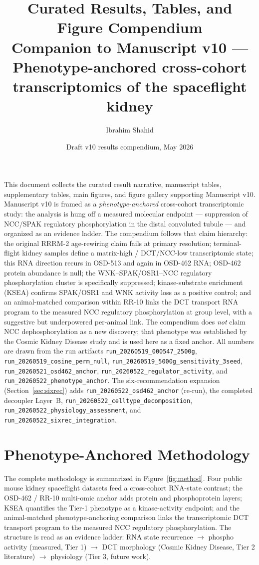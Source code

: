 \documentclass[10pt]{article}
\title{\textbf{Curated Results, Tables, and Figure Compendium}\\[0.3em]
\large Companion to Manuscript v10 --- Phenotype-anchored cross-cohort transcriptomics of the spaceflight kidney}
\author{Ibrahim Shahid}
\date{Draft v10 results compendium, May 2026}
\newcommand{\code}[1]{\texttt{#1}}
\begin{document}
\maketitle
\thispagestyle{fancy}

\noindent
This document collects the curated result narrative, manuscript tables, supplementary tables, main figures, and figure gallery supporting Manuscript v10. Manuscript v10 is framed as a \emph{phenotype-anchored} cross-cohort transcriptomic study: the analysis is hung off a measured molecular endpoint --- suppression of NCC/SPAK regulatory phosphorylation in the distal convoluted tubule --- and organized as an evidence ladder. The compendium follows that claim hierarchy: the original RRRM-2 age-rewiring claim fails at primary resolution; terminal-flight kidney samples define a matrix-high / DCT/NCC-low transcriptomic state; this RNA direction recurs in OSD-513 and again in OSD-462 RNA; OSD-462 protein abundance is null; the WNK--SPAK/OSR1--NCC regulatory phosphorylation cluster is specifically suppressed; kinase-substrate enrichment (KSEA) confirms SPAK/OSR1 and WNK activity loss as a positive control; and an animal-matched comparison within RR-10 links the DCT transport RNA program to the measured NCC regulatory phosphorylation at group level, with a suggestive but underpowered per-animal link. The compendium does \emph{not} claim NCC dephosphorylation as a new discovery; that phenotype was established by the Cosmic Kidney Disease study and is used here as a fixed anchor. All numbers are drawn from the run artifacts \code{run\_20260519\_000547\_2500g}, \code{run\_20260519\_cosine\_perm\_null}, \code{run\_20260519\_5000g\_sensitivity\_3seed}, \code{run\_20260521\_osd462\_anchor}, \code{run\_20260522\_regulator\_activity}, and \code{run\_20260522\_phenotype\_anchor}. The six-recommendation expansion (Section~\ref{sec:sixrec}) adds \code{run\_20260522\_osd462\_anchor} (re-run), the completed decoupler Layer~B, \code{run\_20260522\_celltype\_decomposition}, \code{run\_20260522\_physiology\_assessment}, and \code{run\_20260522\_sixrec\_integration}.

\tableofcontents
\clearpage

\section{Phenotype-Anchored Methodology}

The complete methodology is summarized in Figure~\ref{fig:method}. Four public mouse kidney spaceflight datasets feed a cross-cohort RNA-state contrast; the OSD-462 / RR-10 multi-omic anchor adds protein and phosphoprotein layers; KSEA quantifies the Tier-1 phenotype as a kinase-activity endpoint; and the animal-matched phenotype-anchoring comparison links the transcriptomic DCT transport program to the measured NCC regulatory phosphorylation. The structure is read as an evidence ladder: RNA state recurrence $\rightarrow$ phospho activity (measured, Tier 1) $\rightarrow$ DCT morphology (Cosmic Kidney Disease, Tier 2 literature) $\rightarrow$ physiology (Tier 3, future work).
\end{document}

